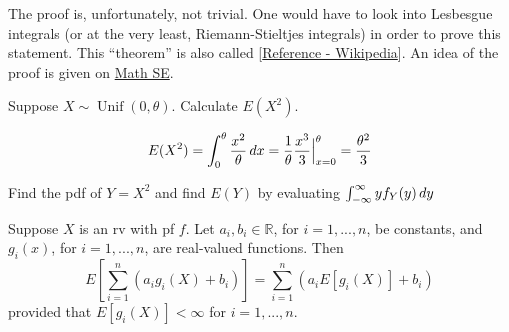 \documentclass[notoc,notitlepage]{tufte-book}
\DeclareMathOperator{\Unif}{Unif }
\begin{document}
The proof is, unfortunately, not trivial. One would have to look into Lesbesgue integrals (or at the very least, Riemann-Stieltjes integrals) in order to prove this statement. This ``theorem'' is also called  [\href{https://en.wikipedia.org/wiki/Law_of_the_unconscious_statistician}{Reference - Wikipedia}]. An idea of the proof is given on \href{https://math.stackexchange.com/questions/1277800/expected-value-of-a-function-of-a-random-variable}{Math SE}.

\begin{eg}
  Suppose $X \sim \Unif(0, \theta)$. Calculate $E(X^2)$.

  \begin{solution}
    \begin{equation*}
      E(X^2) = \int_{0}^{\theta} \frac{x^2}{\theta} \mathop{}\!d{x} = \frac{1}{\theta} \frac{x^3}{3} \Big|_{x = 0}^{\theta} = \frac{\theta^2}{3}
    \end{equation*}
  \end{solution}
\end{eg}

\begin{ex}
  Find the pdf of $Y = X^2$ and find $E(Y)$ by evaluating $\int_{-\infty}^{\infty} y f_Y(y) \mathop{}\!d{y}$
\end{ex}

\begin{thm}
\label{thm:linearity_of_expectation}
  Suppose $X$ is an rv with pf $f$. Let $a_i, b_i \in \mathbb{R}$, for $i = 1, ..., n$, be constants, and $g_i (x)$, for $i = 1, ..., n$, are real-valued functions. Then
  \begin{equation}\label{eq:linearity_of_expectation}
    E \left[ \sum_{i = 1}^{n} \left( a_i g_i(X) + b_i \right) \right] = \sum_{i = 1}^{n} \left( a_i E[ g_i(X) ] + b_i \right)
  \end{equation}
  provided that $E[g_i(X)] < \infty$ for $i = 1, ..., n$.
\end{thm}
\end{document}
